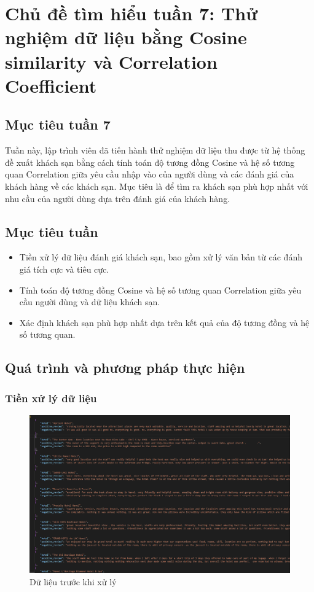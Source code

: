 \section{Chủ đề tìm hiểu tuần 7: Thử nghiệm dữ liệu bằng Cosine similarity và Correlation Coefficient}
\subsection{Mục tiêu tuần 7}
Tuần này, lập trình viên đã tiến hành thử nghiệm dữ liệu thu được từ hệ thống đề xuất khách sạn bằng cách tính toán độ tương đồng Cosine và hệ số tương quan Correlation giữa yêu cầu nhập vào của người dùng và các đánh giá của khách hàng về các khách sạn. Mục tiêu là để tìm ra khách sạn phù hợp nhất với nhu cầu của người dùng dựa trên đánh giá của khách hàng.

\subsection{Mục tiêu tuần}
\begin{itemize}
    \item Tiền xử lý dữ liệu đánh giá khách sạn, bao gồm xử lý văn bản từ các đánh giá tích cực và tiêu cực.
    \item Tính toán độ tương đồng Cosine và hệ số tương quan Correlation giữa yêu cầu người dùng và dữ liệu khách sạn.
    \item Xác định khách sạn phù hợp nhất dựa trên kết quả của độ tương đồng và hệ số tương quan.
\end{itemize}

\subsection{Quá trình và phương pháp thực hiện}
\subsubsection{Tiền xử lý dữ liệu}

\begin{figure}[H]
    \centering
    \includegraphics[width=0.9\linewidth]{Figures/preprocess_data.png}
    \caption{Dữ liệu trước khi xử lý}
    \label{fig:enter-label}
\end{figure}

